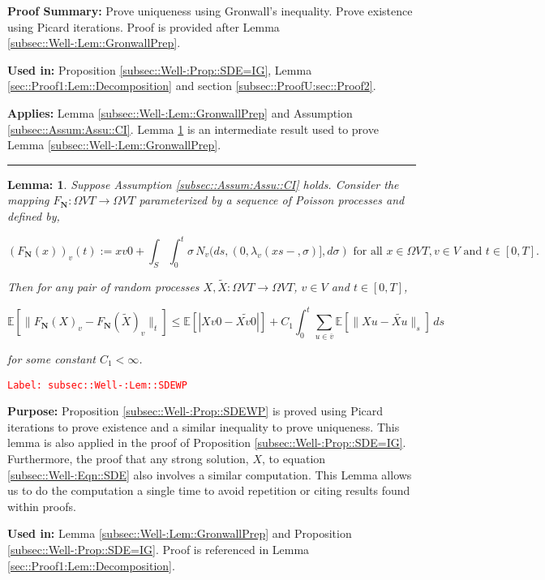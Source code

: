 \documentclass[12pt]{article}
\newcommand{\mb}{\mathbb}
\newcommand{\ra}{\rightarrow}
\newcommand{\ov}{\overline}
\newcommand{\te}{\text}
\newcommand{\tr}{\textcolor{red}}
\newcommand{\labe}[1]{\tr{\texttt{Label: #1}}}
\newcommand{\purpose}{\textbf{Purpose: }}
\newcommand{\pfsum}{\textbf{Proof Summary: }}
\newcommand{\usein}{\textbf{Used in: }}
\newcommand{\app}{\textbf{Applies: }}
\newcommand{\lin}{\rule{\linewidth}{0.4 pt}}
\newcommand{\ex}[1]{\mb{E}\left[#1\right]}			%
\renewcommand{\v}{v}							%
\newcommand{\vv}{u}								%
\renewcommand{\S}{S}							%
\newcommand{\s}{\sigma}							%
\newcommand{\T}{T}								%
\newcommand{\x}{x}								%
\renewcommand{\t}{t}							%
\renewcommand{\tt}{s}							%
\newcommand{\X}{X}								%
\newcommand{\cl}{\ov}							%
\newcommand{\poiss}[1]{N_{#1}}						%
\newcommand{\poisses}{\mathbf{N}}				%
\newcommand{\rate}[1]{\lambda_{#1}}					%
\newcommand{\const}[1]{C_{#1}}						%
\newcommand{\alt}{\widetilde}						%
\newtheorem{lem}[thms]{Lemma: }
\begin{document}
\pfsum Prove uniqueness using Gronwall's inequality. Prove existence using Picard iterations. Proof is provided after Lemma \ref{subsec::Well-:Lem::GronwallPrep}.

\usein Proposition \ref{subsec::Well-:Prop::SDE=IG}, Lemma \ref{sec::Proof1:Lem::Decomposition} and section \ref{subsec::ProofU:sec::Proof2}.

\app Lemma \ref{subsec::Well-:Lem::GronwallPrep} and Assumption \ref{subsec::Assum:Assu::CI}. Lemma \ref{subsec::Well-:Lem::SDEWP} is an intermediate result used to prove Lemma \ref{subsec::Well-:Lem::GronwallPrep}.

\lin

\begin{lem}
Suppose Assumption \ref{subsec::Assum:Assu::CI} holds. Consider the mapping \(F_\poisses: \Omega{ V}{\T} \ra \Omega{ V}{\T}\) parameterized by a sequence of Poisson processes and defined by,

\[\left(F_\poisses(\x{}{})\right)_\v(\t) := \x{\v}{0} + \int_\S\int_0^\t \s \,\poiss{\v}(d\tt,(0,\rate{\v}(\x{}{\tt-},\s)],d\s) \te{ for all }\x{}{} \in \Omega{ V}{\T}, \v \in  V\te{ and }\t \in [0,\T].\]

Then for any pair of random processes \(\X{}{},\alt{\X{}{}}:\Omega{ V}{\T} \ra \Omega{ V}{\T}\), \(\v\in  V\) and \(\t \in [0,\T]\),

\[\ex{\|F_\poisses(\X{}{})_\v - F_\poisses(\alt{\X{}{}})_\v\|_\t} \leq \ex{|\X{\v}{0} - \alt{\X{\v}{0}}|} +  \const{1}\int_0^\t \sum_{\vv\in \cl{\v}} \ex{\|\X{\vv}{} - \alt{\X{\vv}{}}\|_\tt}\,d\tt\]

for some constant \(\const{1} < \infty\).

\label{subsec::Well-:Lem::SDEWP}
\end{lem}
\labe{subsec::Well-:Lem::SDEWP}

\purpose Proposition \ref{subsec::Well-:Prop::SDEWP} is proved using Picard iterations to prove existence and a similar inequality to prove uniqueness. This lemma is also applied in the proof of Proposition \ref{subsec::Well-:Prop::SDE=IG}. Furthermore, the proof that any strong solution, \(\X{}{}\), to equation \eqref{subsec::Well-:Eqn::SDE} also involves a similar computation. This Lemma allows us to do the computation a single time to avoid repetition or citing results found within proofs.

\usein Lemma \ref{subsec::Well-:Lem::GronwallPrep} and Proposition \ref{subsec::Well-:Prop::SDE=IG}. Proof is referenced in Lemma \ref{sec::Proof1:Lem::Decomposition}.
\end{document}
